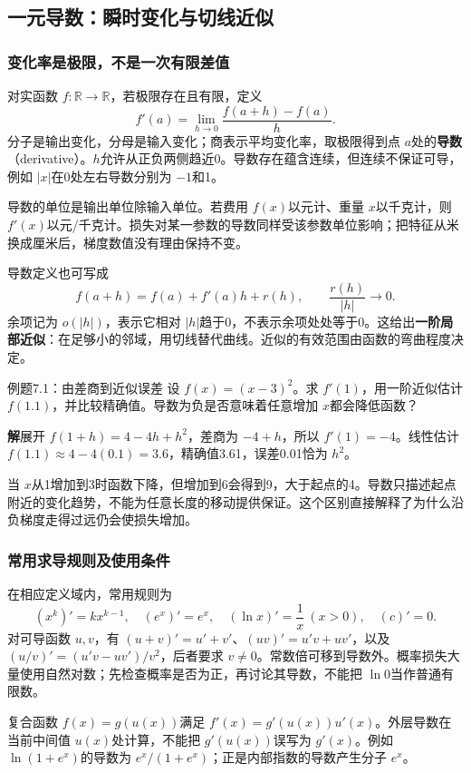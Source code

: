 \documentclass[UTF8,fontset=none,zihao=-4,a4paper]{ctexart}
\newcommand{\term}[1]{\textbf{#1}}
\newcommand{\sol}{\par\noindent\textbf{解}\quad}
\numberwithin{equation}{section}
\numberwithin{figure}{section}
\begin{document}
\subsection{一元导数：瞬时变化与切线近似}
\subsubsection{变化率是极限，不是一次有限差值}
对实函数 $f:\mathbb R\to\mathbb R$，若极限存在且有限，定义
\[
 f'(a)=\lim_{h\to0}\frac{f(a+h)-f(a)}h.
\]
分子是输出变化，分母是输入变化；商表示平均变化率，取极限得到点 $a$处的\term{导数}（derivative）。$h$允许从正负两侧趋近0。导数存在蕴含连续，但连续不保证可导，例如 $|x|$在0处左右导数分别为 $-1$和1。

导数的单位是输出单位除输入单位。若费用 $f(x)$以元计、重量 $x$以千克计，则 $f'(x)$以元/千克计。损失对某一参数的导数同样受该参数单位影响；把特征从米换成厘米后，梯度数值没有理由保持不变。

导数定义也可写成
\[
 f(a+h)=f(a)+f'(a)h+r(h),\qquad \frac{r(h)}{|h|}\to0.
\]
余项记为 $o(|h|)$，表示它相对 $|h|$趋于0，不表示余项处处等于0。这给出\term{一阶局部近似}：在足够小的邻域，用切线替代曲线。近似的有效范围由函数的弯曲程度决定。

\begin{infobox}{例题7.1：由差商到近似误差}
设 $f(x)=(x-3)^2$。求 $f'(1)$，用一阶近似估计 $f(1.1)$，并比较精确值。导数为负是否意味着任意增加 $x$都会降低函数？
\end{infobox}
\sol 展开 $f(1+h)=4-4h+h^2$，差商为 $-4+h$，所以 $f'(1)=-4$。线性估计 $f(1.1)\approx4-4(0.1)=3.6$，精确值3.61，误差0.01恰为 $h^2$。

当 $x$从1增加到3时函数下降，但增加到6会得到9，大于起点的4。导数只描述起点附近的变化趋势，不能为任意长度的移动提供保证。这个区别直接解释了为什么沿负梯度走得过远仍会使损失增加。

\subsubsection{常用求导规则及使用条件}
在相应定义域内，常用规则为
\[
 (x^k)'=kx^{k-1},\quad (e^x)'=e^x,\quad
 (\ln x)'=\frac1x\ (x>0),\quad (c)'=0.
\]
对可导函数 $u,v$，有 $(u+v)'=u'+v'$、$(uv)'=u'v+uv'$，以及 $(u/v)'=(u'v-uv')/v^2$，后者要求 $v\ne0$。常数倍可移到导数外。概率损失大量使用自然对数；先检查概率是否为正，再讨论其导数，不能把 $\ln0$当作普通有限数。

复合函数 $f(x)=g(u(x))$满足 $f'(x)=g'(u(x))u'(x)$。外层导数在当前中间值 $u(x)$处计算，不能把 $g'(u(x))$误写为 $g'(x)$。例如 $\ln(1+e^x)$的导数为 $e^x/(1+e^x)$；正是内部指数的导数产生分子 $e^x$。
\end{document}
